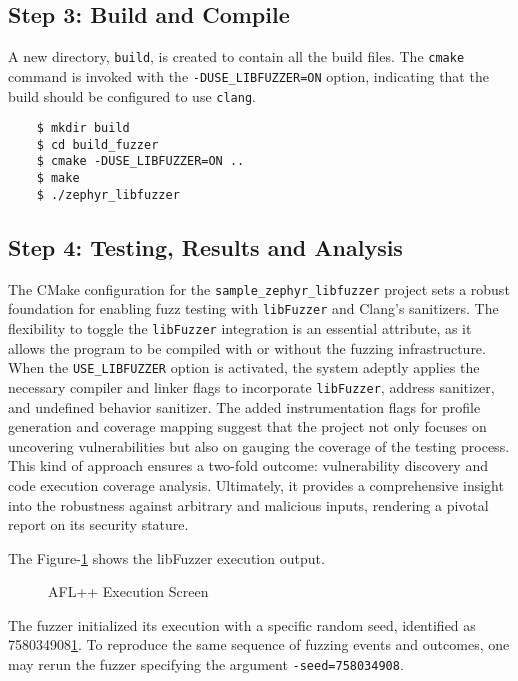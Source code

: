 \subsection*{Step 3: Build and Compile}
A new directory, \texttt{build}, is created to contain all the build files.
The \texttt{cmake} command is invoked with the \texttt{-DUSE\_LIBFUZZER=ON} option,
indicating that the build should be configured to
use \texttt{clang}\cite{ClangCLa81:online}.

\begin{verbatim}
    $ mkdir build
    $ cd build_fuzzer
    $ cmake -DUSE_LIBFUZZER=ON ..
    $ make
    $ ./zephyr_libfuzzer
\end{verbatim}

\subsection*{Step 4: Testing, Results and Analysis}
The CMake configuration for the \texttt{sample\_zephyr\_libfuzzer} project sets
a robust foundation for enabling fuzz testing with \texttt{libFuzzer} and
Clang's sanitizers. The flexibility to toggle the \texttt{libFuzzer} integration
is an essential attribute, as it allows the program to be compiled with or
without the fuzzing infrastructure. When the \texttt{USE\_LIBFUZZER} option is
activated, the system adeptly applies the necessary compiler and linker flags
to incorporate \texttt{libFuzzer}, address sanitizer, and undefined behavior
sanitizer. The added instrumentation flags for profile generation and coverage
mapping suggest that the project not only focuses on uncovering vulnerabilities
but also on gauging the coverage of the testing process. This kind of approach
ensures a two-fold outcome: vulnerability discovery and code execution
coverage analysis. Ultimately, it provides a comprehensive insight into the
robustness against arbitrary and malicious inputs, rendering a pivotal report
on its security stature.


The Figure-\ref{fig:lib_fuzzer} shows the libFuzzer execution output.
\begin{figure}[H]
    \caption{AFL++ Execution Screen}\label{fig:lib_fuzzer}
\end{figure}
The fuzzer initialized its execution with a specific random seed,
identified as 758034908\ref{fig:lib_fuzzer}. To reproduce the same
sequence of fuzzing events and outcomes, one may rerun the fuzzer
specifying the argument \texttt{-seed=758034908}.

